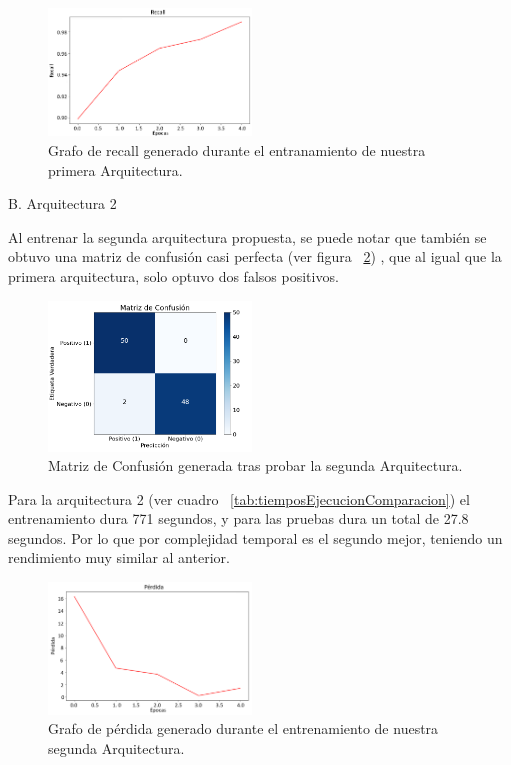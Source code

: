\documentclass[conference, spanish, english]{IEEEtran}
\begin{document}
\begin{figure}[H]
\centering
\includegraphics[width=0.48\textwidth]{training_plots/plot_architecture_2/recall_plot.png}
\caption{Grafo de recall generado durante el entranamiento de nuestra primera Arquitectura.}
\label{fig:recallArqui1}
\end{figure}



\begin{center}
    B. Arquitectura 2
\end{center}
Al entrenar la segunda arquitectura propuesta, se puede notar que también se obtuvo una matriz de confusión casi perfecta (ver figura ~\ref{fig:MatrizArqui2}) , que al igual que la primera arquitectura, solo optuvo dos falsos positivos. 

\begin{figure}[H]
\centering
\includegraphics[width=0.48\textwidth]{training_plots/plot_architecture_3/confusion_matrix.png}
\caption{Matriz de Confusión generada tras probar la segunda Arquitectura.}
\label{fig:MatrizArqui2}
\end{figure}


Para la arquitectura 2 (ver cuadro ~\ref{tab:tiemposEjecucionComparacion}) el entrenamiento dura 771 segundos, y para las pruebas dura un total de 27.8 segundos. Por lo que por complejidad temporal es el segundo mejor, teniendo un rendimiento muy similar al anterior.

\begin{figure}[H]
\centering
\includegraphics[width=0.48\textwidth]{training_plots/plot_architecture_3/loss_plot.png}
\caption{Grafo de pérdida generado durante el entrenamiento de nuestra segunda Arquitectura.}
\label{fig:perdidaArqui2}
\end{figure}
\end{document}
